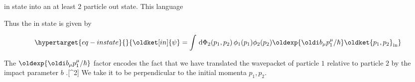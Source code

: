 \documentclass[
  letterpaper,
  DIV=11,
  numbers=noendperiod,
  oneside]{scrreprt}
\begin{document}
in state into an at least 2 particle out state. This language

Thus the in state is given by

\begin{equation}\protect\hypertarget{eq-instate}{}{\oldket[in]{\psi}=\int \,\mathtip{\mathrm{d}\Phi_{2}(p_1,p_2)}{\text{On shell integration measure: } \mathrm{d}\Phi(p_i)=\,\mathtip{\tilde{\mathrm{d}}^{4}p_i}{\tilde{\mathrm{d}}^{4}p_i=\frac{\,\mathrm{d}^{4}p_i\,}{(2\pi)^{4}}}\,\mathtip{\tilde{\delta}^{(+)}\left(p_i^2-m_i^2\right)}{\text{Normalized positive energy delta function: }\tilde{\delta}^{(+)}\left(p_i^2-m_i^2\right)=\texttip{\delta^{(+)}\left(p_i^2-m_i^2\right)}{Dirac delta function} 2\pi= 2 \pi \texttip{\delta^{()}\left(p_i^2 -m_i^2\right)}{Dirac delta function}\texttip{\Theta^{()}\left(p_i^0\right)}{Heaviside step function}}}\, \phi_1(p_1) \phi_2(p_2) \oldexp{\oldi b_\mu p^\mu_1 /\hbar}\oldket{p_1,p_2}_\text{in}}\label{eq-instate}\end{equation}

The \(\oldexp{\oldi b_\mu p^\mu_1 /\hbar}\) factor encodes the fact that
we have translated the wavepacket of particle \(1\) relative to particle
\(2\) by the impact parameter \(b\) .{[}\^{}2{]} We take it to be
perpendicular to the initial momenta \(p_1,p_2\).
\end{document}
